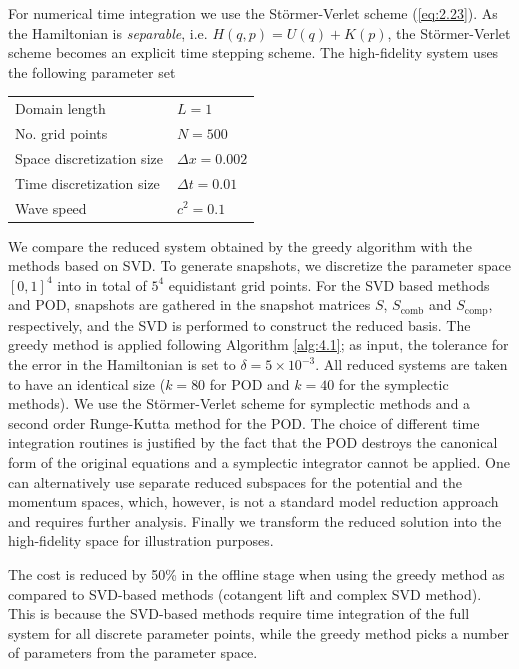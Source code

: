 For numerical time integration we use the St\"ormer-Verlet scheme (\ref{eq:2.23}). As the Hamiltonian is \emph{separable}, i.e. $H(q,p) = U(q) + K(p)$, the St\"ormer-Verlet scheme becomes an explicit time stepping scheme. The high-fidelity system uses the following parameter set \vspace{0.5cm}
\begin{center}
\begin{tabular}{|l|l|}
\hline
Domain length & $L = 1$ \\
No. grid points & $N = 500$ \\
Space discretization size & $\Delta x = 0.002$ \\
Time discretization size & $\Delta t = 0.01$ \\
Wave speed & $c^2 = 0.1$ \\
\hline
\end{tabular}
\end{center}
\vspace{0.5cm}
We compare the reduced system obtained by the greedy algorithm with the methods based on SVD. To generate snapshots, we discretize the parameter space $[0,1]^4$ into in total of $5^4$ equidistant grid points. For the SVD based methods and POD, snapshots are gathered in the snapshot matrices $S$, $S_{\text{comb}}$ and $S_{\text{comp}}$, respectively, and the SVD is performed to construct the reduced basis. The greedy method is applied following Algorithm \ref{alg:4.1}; as input, the tolerance for the error in the Hamiltonian is set to $\delta = 5 \times 10^{-3}$. All reduced systems are taken to have an identical size ($k=80$ for POD and $k=40$ for the symplectic methods). We use the St\"ormer-Verlet scheme for symplectic methods and a second order Runge-Kutta method for the POD. The choice of different time integration routines is justified by the fact that the POD destroys the canonical form of the original equations and a symplectic integrator cannot be applied. One can alternatively use separate reduced subspaces for the potential and the momentum spaces, which, however, is not a standard model reduction approach and requires further analysis. Finally we transform the reduced solution into the high-fidelity space for illustration purposes.



The cost is reduced by 50\% in the offline stage when using the greedy method as compared to SVD-based methods (cotangent lift and complex SVD method). This is because the SVD-based methods require time integration of the full system for all discrete parameter points, while the greedy method picks a number of parameters from the parameter space. 

